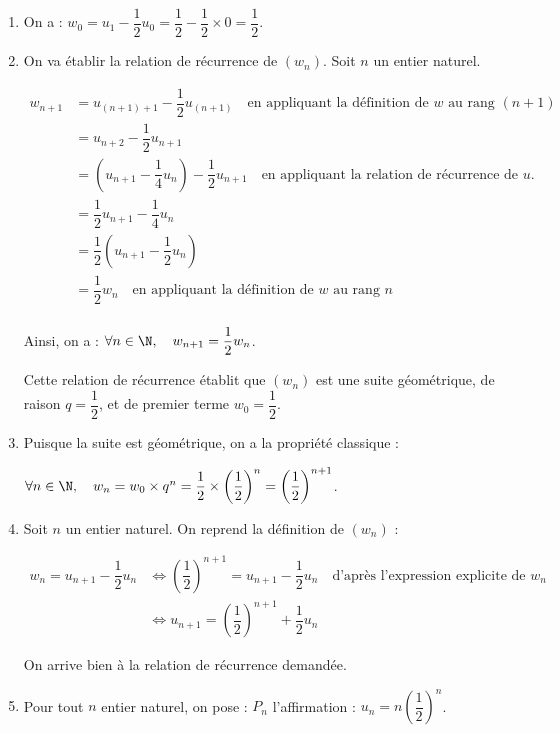 \begin{enumerate}
\item On a : \quad$w_{0} = u_1 - \dfrac{1}{2}u_0 = \dfrac{1}{2} - \dfrac{1}{2}\times 0 = \dfrac{1}{2}$.
\item On va établir la relation de récurrence de $(w_n)$. Soit $n$ un entier naturel.

$\begin{aligned}
	w_{n+1} &= u_{(n+1) + 1} - \dfrac{1}{2} u_{(n+1)} \quad \text{en appliquant la définition de $w$ au rang }(n+1)\\
	&= u_{n+2} - \dfrac{1}{2}u_{n+1}\\
	&=\left(u_{n+1} - \dfrac{1}{4}u_n\right)	- \dfrac{1}{2}u_{n+1}\quad\text{en appliquant la relation de récurrence de }u. \\
	&=\dfrac{1}{2}u_{n+1} - \dfrac{1}{4}u_n\\
	&=\dfrac{1}{2}\left(u_{n+1} - \dfrac{1}{2}u_n\right) \\
	&=\dfrac{1}{2}w_n\quad \text{en appliquant la définition de $w$ au rang }n\\
\end{aligned}$

Ainsi, on a : \quad $\forall n \in \N,\quad w_{n+1} = \dfrac{1}{2}w_n$.

Cette relation de récurrence établit que $(w_n)$ est une suite géométrique, de raison $q = \dfrac{1}{2}$, et de premier terme $w_0 = \dfrac{1}{2}$.

\item Puisque la suite est géométrique, on a la propriété classique :

$\forall n \in \N,\quad w_n = w_0 \times q^n = \dfrac{1}{2} \times \left(\dfrac{1}{2}\right)^n = \left(\dfrac{1}{2}\right)^{n+1}$.
\item Soit $n$ un entier naturel. On reprend la définition de $(w_n)$ :

$\begin{aligned}
	w_n = u_{n+1} - \dfrac{1}{2}u_n&\iff
	\left(\dfrac{1}{2}\right)^{n+1} = u_{n+1} - \dfrac{1}{2}u_n\quad \text{d'après l'expression explicite de }w_n\\
	&\iff u_{n+1}=\left(\dfrac{1}{2}\right)^{n+1}+\dfrac{1}{2} u_{n}
\end{aligned}$

On arrive bien à la relation de récurrence demandée.

\item Pour tout $n$ entier naturel, on pose : $P_n$ l'affirmation : \og $u_n = n\left(\dfrac{1}{2}\right)^{n}$\fg{}.


\end{enumerate}
